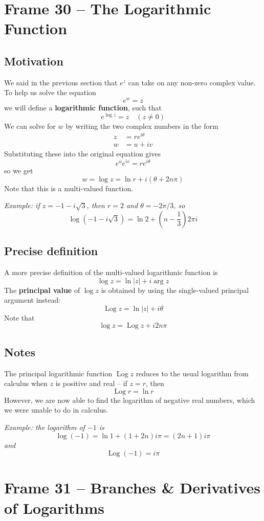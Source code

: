 \documentclass{article}
\renewcommand{\emph}{\textbf}
\DeclareMathOperator{\Log}{Log}
\begin{document}
\clearpage
\section{Frame 30 -- The Logarithmic Function}
\subsection{Motivation}
We said in the previous section that $e^z$ can take on any non-zero complex value. To help us solve the equation
\[
	e^w = z
\]
we will define a \emph{logarithmic function}, such that
\[
	e^{\log z} = z	\quad (z \neq 0)
\]
We can solve for $w$ by writing the two complex numbers in the form
\begin{align*}
	z &= re^{i\theta} \\
	w &= u + iv
\end{align*}
Substituting these into the original equation gives
\[
	e^u e^{iv} = re^{i\theta}
\]
so we get
\[
	w = \log z = \ln r + i(\theta + 2n\pi)
\]
Note that this is a multi-valued function.

\textit{Example: if $z = -1 - i\sqrt{3}$, then $r = 2$ and $\theta = -2\pi/3$, so
\[
	\log(-1 - i\sqrt{3}) = \ln 2 + \left(n - \frac{1}{3}\right) 2\pi i
\]}

\subsection{Precise definition}
A more precise definition of the multi-valued logarithmic function is
\[
	\log z = \ln |z| + i \arg z
\]
The \emph{principal value} of $\log z$ is obtained by using the single-valued principal argument instead:
\[
	\Log z = \ln |z| + i \theta
\]
Note that
\[
	\log z = \Log z + i 2n\pi
\]

\subsection{Notes}
The principal logarithmic function $\Log z$ reduces to the usual logarithm from calculus when $z$ is positive and real -- if $z = r$, then
\[
	\Log r = \ln r
\]
However, we are now able to find the logarithm of negative real numbers, which we were unable to do in calculus.

\textit{Example: the logarithm of $-1$ is
\[
	\log(-1) = \ln 1 + (1 + 2n)i\pi = (2n + 1)i\pi
\]
and
\[
	\Log(-1) = i\pi
\]}


\clearpage
\section{Frame 31 -- Branches \& Derivatives of Logarithms}
\end{document}
